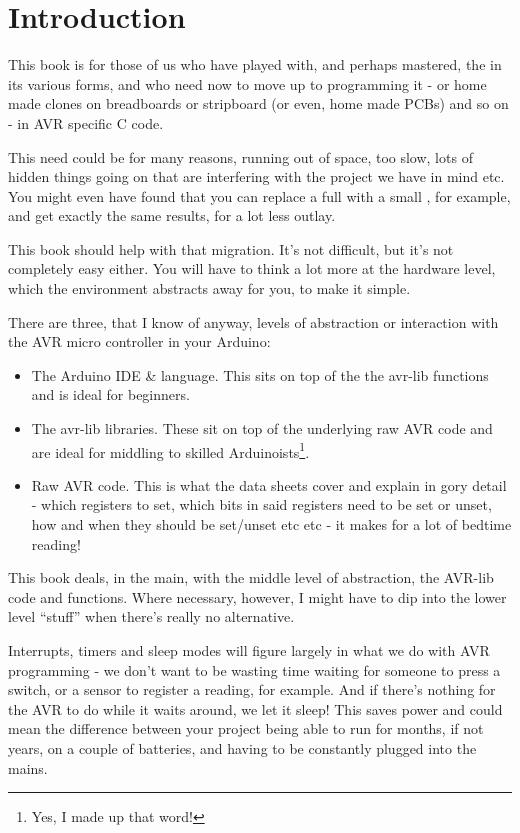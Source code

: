 \section*{Introduction}\label{introduction}

This book is for those of us who have played with, and perhaps mastered, the  in its various forms, and who need now to move up to programming it - or home made clones on breadboards or stripboard (or even, home made PCBs) and so on - in AVR specific C code.

This need could be for many reasons, running out of space, too slow, lots of hidden things going on that are interfering with the project we have in mind etc. You might even have found that you can replace a full  with a small , for example, and get exactly the same results, for a lot less outlay.

This book should help with that migration. It's not difficult, but it's not completely easy either. You will have to think a lot more at the hardware level, which the   environment abstracts away for you, to make it simple.

There are three, that I know of anyway, levels of abstraction or interaction with the AVR micro controller in your Arduino:

\begin{itemize}
	\item The Arduino IDE \& language. This sits on top of the the avr-lib functions and is ideal for beginners.
	\item The avr-lib libraries. These sit on top of the underlying raw AVR code and are ideal for middling to skilled Arduinoists\footnote{Yes, I made up that word!}. 
	\item Raw AVR code. This is what the data sheets cover and explain in gory detail - which registers to set, which bits in said registers need to be set or unset, how and when they should be set/unset etc etc - it makes for a lot of bedtime reading!
\end{itemize}

This book deals, in the main, with the middle level of abstraction, the AVR-lib code and functions. Where necessary, however, I might have to dip into the lower level ``stuff'' when there's really no alternative.

Interrupts, timers and sleep modes will figure largely in what we do with AVR programming - we don't want to be wasting time waiting for someone to press a switch, or a sensor to register a reading, for example. And if there's nothing for the AVR to do while it waits around, we let it sleep! This saves power and could mean the difference between your project being able to run for months, if not years, on a couple of batteries, and having to be constantly plugged into the mains.

